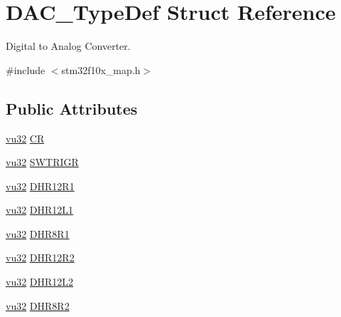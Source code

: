 \hypertarget{struct_d_a_c___type_def}{}\section{D\+A\+C\+\_\+\+Type\+Def Struct Reference}
\label{struct_d_a_c___type_def}


Digital to Analog Converter.  




{\ttfamily \#include $<$stm32f10x\+\_\+map.\+h$>$}

\subsection*{Public Attributes}
\begin{DoxyCompactItemize}
\item 
\hyperlink{agilefox_2library_2inc_2stm32f10x__type_8h_a6e2761f0a1011f84ed96b946f2c8a563}{vu32} \hyperlink{struct_d_a_c___type_def_a7794f8bc0b891040b260ee3d9d5812c7}{CR}
\item 
\hyperlink{agilefox_2library_2inc_2stm32f10x__type_8h_a6e2761f0a1011f84ed96b946f2c8a563}{vu32} \hyperlink{struct_d_a_c___type_def_af0ca3bc9469062c7c7505327e887fc53}{S\+W\+T\+R\+I\+GR}
\item 
\hyperlink{agilefox_2library_2inc_2stm32f10x__type_8h_a6e2761f0a1011f84ed96b946f2c8a563}{vu32} \hyperlink{struct_d_a_c___type_def_a999c6632fe6a753d663d5b47154d5593}{D\+H\+R12\+R1}
\item 
\hyperlink{agilefox_2library_2inc_2stm32f10x__type_8h_a6e2761f0a1011f84ed96b946f2c8a563}{vu32} \hyperlink{struct_d_a_c___type_def_a7c016a47cfb4f768e7048337bfe83b5f}{D\+H\+R12\+L1}
\item 
\hyperlink{agilefox_2library_2inc_2stm32f10x__type_8h_a6e2761f0a1011f84ed96b946f2c8a563}{vu32} \hyperlink{struct_d_a_c___type_def_a8e931bca2083a7d83bf842f0b068feee}{D\+H\+R8\+R1}
\item 
\hyperlink{agilefox_2library_2inc_2stm32f10x__type_8h_a6e2761f0a1011f84ed96b946f2c8a563}{vu32} \hyperlink{struct_d_a_c___type_def_abbead68762678e846edf7e562ef37e51}{D\+H\+R12\+R2}
\item 
\hyperlink{agilefox_2library_2inc_2stm32f10x__type_8h_a6e2761f0a1011f84ed96b946f2c8a563}{vu32} \hyperlink{struct_d_a_c___type_def_a020874642baaeedd60c3534d070f8819}{D\+H\+R12\+L2}
\item 
\hyperlink{agilefox_2library_2inc_2stm32f10x__type_8h_a6e2761f0a1011f84ed96b946f2c8a563}{vu32} \hyperlink{struct_d_a_c___type_def_a260b8ddafeb6142995d88612dc9b33e5}{D\+H\+R8\+R2}

\end{DoxyCompactItemize}
